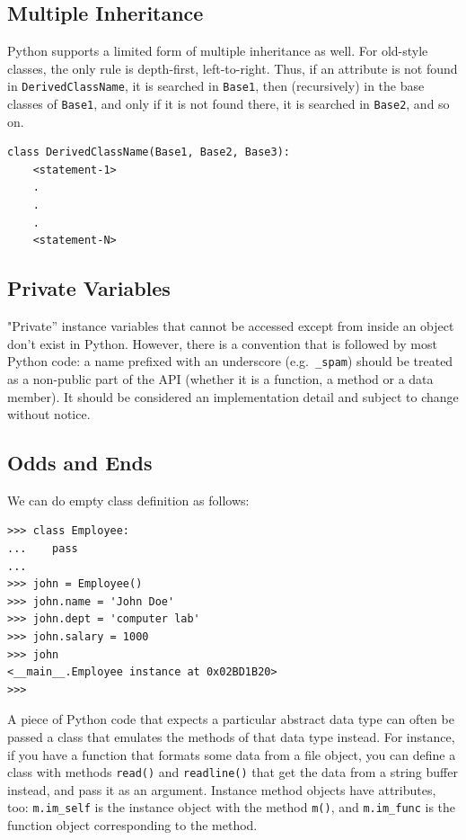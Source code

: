 \documentclass[12pt,a4paper]{article}
\begin{document}
\subsection{Multiple Inheritance}
Python supports a limited form of multiple inheritance as well. For old-style classes, the only rule is depth-first, left-to-right. Thus, if an attribute is not found in \texttt{DerivedClassName}, it is searched in \texttt{Base1}, then (recursively) in the base classes of \texttt{Base1}, and only if it is not found there, it is searched in \texttt{Base2}, and so on.
\begin{verbatim}
class DerivedClassName(Base1, Base2, Base3):
    <statement-1>
    .
    .
    .
    <statement-N>
\end{verbatim}
\subsection{Private Variables}
"Private” instance variables that cannot be accessed except from inside an object don’t exist in Python. However,
there is a convention that is followed by most Python code: a name prefixed with an underscore (e.g.\texttt{ \_spam})
should be treated as a non-public part of the API (whether it is a function, a method or a data member). It should
be considered an implementation detail and subject to change without notice.
\subsection{Odds and Ends}
We can do empty class definition as follows:
\begin{verbatim}
>>> class Employee:
...    pass
...
>>> john = Employee()
>>> john.name = 'John Doe'
>>> john.dept = 'computer lab'
>>> john.salary = 1000
>>> john
<__main__.Employee instance at 0x02BD1B20>
>>> 
\end{verbatim}
A piece of Python code that expects a particular abstract data type can often be passed a class that emulates the methods of that data type instead. For instance, if you have a function that formats some data from a file object, you can define a class with methods \texttt{read()} and \texttt{readline()} that get the data from a string buffer instead, and pass it as an argument. Instance method objects have attributes, too: \texttt{m.im\_self} is the instance object with the method \texttt{m()}, and \texttt{m.im\_func} is the function object corresponding to the method.
\end{document}
